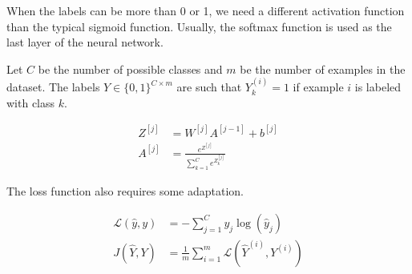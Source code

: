 When the labels can be more than 0 or 1, we need a different activation function than the typical sigmoid function.
Usually, the softmax function is used as the last layer of the neural network.

Let $C$ be the number of possible classes and $m$ be the number of examples in the dataset.
The labels $Y\in\{0,1\}^{C\times m}$ are such that $Y_k^{(i)} = 1$ if example $i$ is labeled with class $k$.

\begin{align}
	Z^{[j]} &= W^{[j]} A^{[j-1]} + b^{[j]} \\
	A^{[j]} &= \frac{e^{Z^{[j]} }}{\sum_{k=1}^{C} e^{Z^{[j]}_k }}
\end{align}

The loss function also requires some adaptation.

\begin{align}
	\mathcal{L}(\hat{y}, y) &= - \sum_{j=1}^{C} y_j \log(\hat{y}_j) \\
	J(\hat{Y}, Y) &= \frac{1}{m} \sum_{i=1}^{m} \mathcal{L}(\hat{Y}^{(i)}, Y^{(i)})
\end{align}